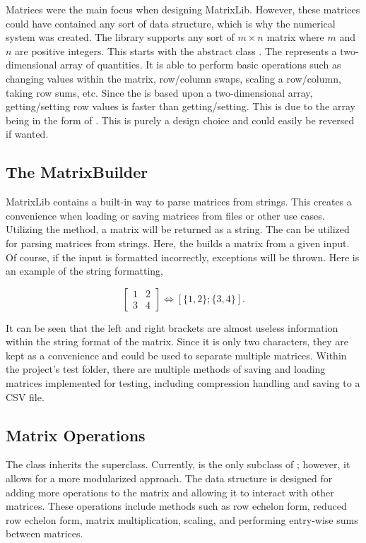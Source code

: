 Matrices were the main focus when designing MatrixLib.
However, these matrices could have contained any sort of data structure, which is why the numerical system was created.
The library supports any sort of $m\times n$ matrix where $m$ and $n$ are positive integers.
This starts with the abstract class .
The  represents a two-dimensional array of quantities.
It is able to perform basic operations such as changing values within the matrix, row/column swaps, scaling a row/column, taking row sums, etc.
Since the  is based upon a two-dimensional array, getting/setting row values is faster than getting/setting.
This is due to the array being in the form of .
This is purely a design choice and could easily be reversed if wanted.

\subsection*{The MatrixBuilder}
MatrixLib contains a built-in way to parse matrices from strings.
This creates a convenience when loading or saving matrices from files or other use cases.
Utilizing the  method, a matrix will be returned as a string.
The  can be utilized for parsing matrices from strings.
Here, the  builds a matrix from a given input.
Of course, if the input is formatted incorrectly, exceptions will be thrown.
Here is an example of the string formatting,

\[
    \begin{bmatrix}
        1 & 2 \\3&4
    \end{bmatrix}
    \iff
    [\{1,2\};\{3,4\}].
\]

It can be seen that the left and right brackets are almost useless information within the string format of the matrix.
Since it is only two characters, they are kept as a convenience and could be used to separate multiple matrices.
Within the project's test folder, there are multiple methods of saving and loading matrices implemented for testing, including compression handling and saving to a CSV file.

\subsection*{Matrix Operations}
The  class inherits the  superclass.
Currently,  is the only subclass of ; however, it allows for a more modularized approach.
The  data structure is designed for adding more operations to the matrix and allowing it to interact with other matrices.
These operations include methods such as row echelon form, reduced row echelon form, matrix multiplication, scaling, and performing entry-wise sums between matrices.


